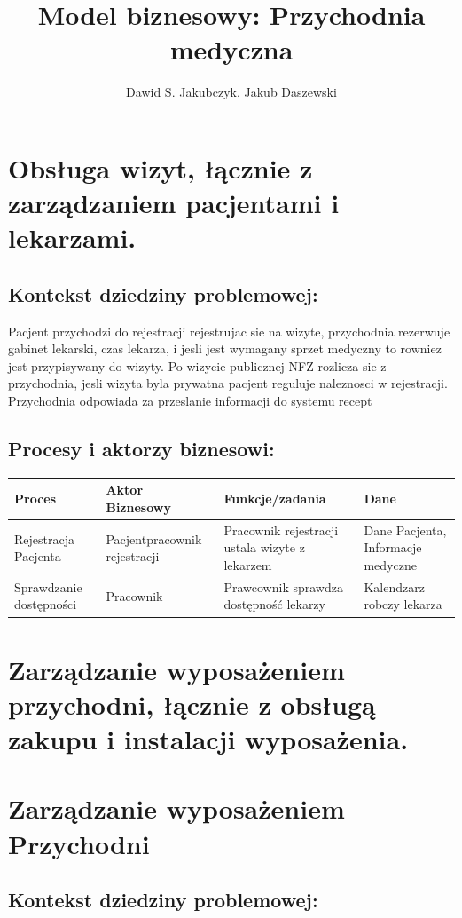 \documentclass{article}
\author{Dawid S. Jakubczyk, Jakub Daszewski}
\title{Model biznesowy: Przychodnia medyczna}
\begin{document}
\maketitle
\newpage
\section*{Obsługa wizyt, łącznie z zarządzaniem pacjentami i lekarzami.}

\subsection*{Kontekst dziedziny problemowej:}
Pacjent przychodzi do rejestracji rejestrujac sie na wizyte, przychodnia rezerwuje gabinet lekarski, czas lekarza, i jesli jest wymagany sprzet medyczny to rowniez jest przypisywany do wizyty. Po wizycie publicznej NFZ rozlicza sie z przychodnia, jesli wizyta byla prywatna pacjent reguluje naleznosci w rejestracji.
Przychodnia odpowiada za przeslanie informacji do systemu recept 
\subsection*{Procesy i aktorzy biznesowi:}

\begin{tabular}{|m{6em}|m{10em}|m{18em}|m{7em}|}
\hline
\rowcolor{lightgray} Proces & Aktor Biznesowy & Funkcje/zadania & Dane\\
\hline
Rejestracja Pacjenta	& Pacjent\newline pracownik rejestracji & Pracownik rejestracji ustala wizyte z lekarzem & Dane Pacjenta, Informacje medyczne\\
\hline
Sprawdzanie dostępności & Pracownik & Prawcownik sprawdza dostępność lekarzy & Kalendzarz robczy lekarza\\
\hline
\end{tabular}
\newpage
\section*{Zarządzanie wyposażeniem przychodni, łącznie z obsługą zakupu i instalacji wyposażenia.
}
\section{Zarządzanie wyposażeniem Przychodni}
\subsection*{Kontekst dziedziny problemowej:}
\end{document}
